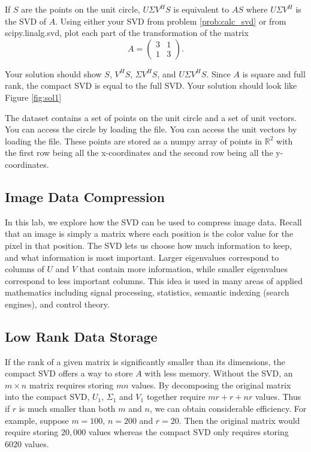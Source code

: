 \begin{problem}
If $S$ are the points on the unit circle, $U\Sigma V^HS$ is equivalent to $AS$ where $U\Sigma V^H$ is the SVD of $A$. Using either your SVD from problem \ref{prob:calc_svd} or from scipy.linalg.svd, plot each part of the transformation of the matrix
\begin{equation}
A =  \begin{pmatrix}3 & 1\\1 & 3\end{pmatrix}.
\end{equation}

Your solution should show $S$, $V^HS$, $\Sigma V^HS$, and $U\Sigma V^HS$.
Since $A$ is square and full rank, the compact SVD is equal to the full SVD.
Your solution should look like Figure \ref{fig:sol1}

The  dataset contains a set of points on the unit circle and a set of unit vectors. You can access the circle by loading the  file. You can access the unit vectors by loading the  file. These points are stored as a numpy array of points in $\mathbb{R}^2$ with the first row being all the x-coordinates and the second row being all the y-coordinates.
\end{problem}


\subsection*{Image Data Compression}

In this lab, we explore how the SVD can be used to compress image data.
Recall that an image is simply a matrix where each position is the color value for the pixel in that position.
The SVD lets us choose how much information to keep, and what information is most important.
Larger eigenvalues correspond to columns of $U$ and $V$ that contain more information, while smaller eigenvalues correspond to less important columns.
This idea is used in many areas of applied mathematics including signal processing, statistics, semantic indexing (search engines), and control theory.


\subsection*{Low Rank Data Storage}
If the rank of a given matrix is significantly smaller than its dimensions, the compact SVD offers a way to store $A$ with less memory.
Without the SVD, an $m\times n$ matrix requires storing $mn$ values.
By decomposing the original matrix into the compact SVD, $U_1$, $\Sigma_1$ and $V_1$ together require $mr+r+nr$ values.
Thus if $r$ is much smaller than both $m$ and $n$, we can obtain considerable efficiency.
For example, suppose $m=100$, $n=200$ and $r=20$.
Then the original matrix would require storing $20,000$ values whereas the compact SVD only requires storing $6020$ values.

